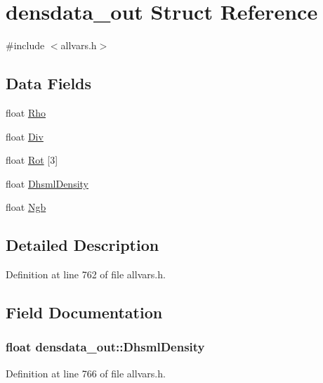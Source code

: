 \hypertarget{structdensdata__out}{
\section{densdata\_\-out Struct Reference}
\label{structdensdata__out}
}


{\ttfamily \#include $<$allvars.h$>$}

\subsection*{Data Fields}
\begin{DoxyCompactItemize}
\item 
float \hyperlink{structdensdata__out_a7a4edc5de1283464a658fb089594d11c}{Rho}
\item 
float \hyperlink{structdensdata__out_af3c2ce61474da5764ac1b50155c0aa7e}{Div}
\item 
float \hyperlink{structdensdata__out_a748be7d0e50757980389fb667d6d022b}{Rot} \mbox{[}3\mbox{]}
\item 
float \hyperlink{structdensdata__out_a4a4b92bd40642207d3e6748ae90c8d49}{DhsmlDensity}
\item 
float \hyperlink{structdensdata__out_ad78ddc3f9c8fb77b2e98f04d5cd2dfb4}{Ngb}
\end{DoxyCompactItemize}


\subsection{Detailed Description}


Definition at line 762 of file allvars.h.



\subsection{Field Documentation}
\hypertarget{structdensdata__out_a4a4b92bd40642207d3e6748ae90c8d49}{
\subsubsection[{DhsmlDensity}]{\setlength{\rightskip}{0pt plus 5cm}float {\bf densdata\_\-out::DhsmlDensity}}}
\label{structdensdata__out_a4a4b92bd40642207d3e6748ae90c8d49}


Definition at line 766 of file allvars.h.



